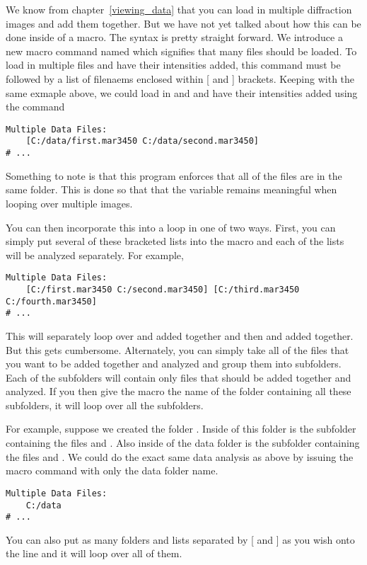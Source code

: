 We know from chapter~\ref{viewing_data} that
you can load in multiple diffraction images and add them
together. But we have not yet talked about how this can
be done inside of a macro. The syntax is pretty straight
forward. We introduce a new macro command named
 which signifies that
many files should be loaded. To load in multiple files
and have their intensities added, this command must be 
followed by a list of filenaems enclosed within
[ and ] brackets. Keeping with the same exmaple above,
we could load in  and
 and have their
intensities added using the command
\begin{lstlisting}[caption={'Add the intensities'}]
Multiple Data Files:
    [C:/data/first.mar3450 C:/data/second.mar3450]
# ...
\end{lstlisting}
Something to note is that this program enforces that
all of the files are in the same folder. This is done
so that that the  variable remains 
meaningful when looping over multiple images.

You can then incorporate this into a loop in
one of two ways. First, you can simply put several
of these bracketed lists into the macro and each
of the lists will be analyzed separately. For example,
\begin{lstlisting}[caption={'Loop Over the Analysis'}]
Multiple Data Files:
    [C:/first.mar3450 C:/second.mar3450] [C:/third.mar3450 C:/fourth.mar3450]
# ...
\end{lstlisting}
This will separately loop over  
and  added together and then 
 and 
added together. But this gets cumbersome. Alternately,
you can simply take all of the files that you want to be 
added together and analyzed and group them into subfolders. 
Each of the subfolders will contain only files that should
be added together and analyzed. If you then give the
macro the name of the folder containing all these subfolders,
it will loop over all the subfolders. 

For example, suppose we created the folder .
Inside of this folder is the subfolder 
containing the files  and 
. Also inside of the data folder
is the subfolder  containing the files
 and .
We could do the exact same data analysis as above by 
issuing the macro command with only the data folder name.
\begin{lstlisting}[caption={'Using the Folder Syntax'}]
Multiple Data Files:
    C:/data
# ...
\end{lstlisting}
You can also put as many folders and lists separated
by [ and ] as you wish onto the line and it will loop
over all of them.

